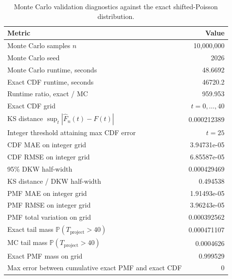 \begin{table}
\caption{Monte Carlo validation diagnostics against the exact shifted-Poisson distribution.}
\label{tab:mc_validation_diagnostics}
\begin{tabular}{lr}
\toprule
Metric & Value \\
\midrule
Monte Carlo samples $n$ & 10,000,000 \\
Monte Carlo seed & 2026 \\
Monte Carlo runtime, seconds & 48.6692 \\
Exact CDF runtime, seconds & 46720.2 \\
Runtime ratio, exact / MC & 959.953 \\
Exact CDF grid & $t=0,\ldots,40$ \\
KS distance $\sup_t |\widehat F_n(t)-F(t)|$ & 0.000212389 \\
Integer threshold attaining max CDF error & $t=25$ \\
CDF MAE on integer grid & 3.94731e-05 \\
CDF RMSE on integer grid & 6.85587e-05 \\
95\% DKW half-width & 0.000429469 \\
KS distance / DKW half-width & 0.494538 \\
PMF MAE on integer grid & 1.91493e-05 \\
PMF RMSE on integer grid & 3.96243e-05 \\
PMF total variation on grid & 0.000392562 \\
Exact tail mass $\mathbb{P}(T_{\mathrm{project}}>40)$ & 0.000471107 \\
MC tail mass $\mathbb{P}(T_{\mathrm{project}}>40)$ & 0.0004626 \\
Exact PMF mass on grid & 0.999529 \\
Max error between cumulative exact PMF and exact CDF & 0 \\
\bottomrule
\end{tabular}
\end{table}
